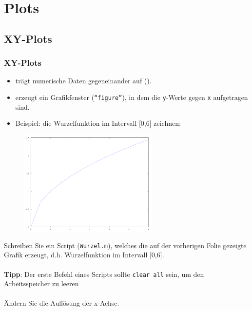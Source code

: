       \section{Plots}

      \subsection{XY-Plots}
      \begin{frame}
          \frametitle{XY-Plots}

          \vspace{-0.5cm}

          \begin{itemize}
              \item {} trägt numerische Daten gegeneinander auf ().
              \item {} erzeugt ein Grafikfenster (\texttt{``figure''}), in dem die \texttt{y}-Werte gegen \texttt{x} aufgetragen sind.
              \item Beispiel: die Wurzelfunktion im Intervall [0,6] zeichnen:
          \end{itemize}

          \vspace{-0.3cm}

          \begin{figure}
              \includegraphics[width=7.0cm]{example2_1.png}
          \end{figure}
      \end{frame}

      \secMexercise
      \begin{frame}
          \frameMexercise
          \begin{exercise}
              \sloppy
              Schreiben Sie ein Script (\texttt{Wurzel.m}), welches die auf der vorherigen Folie gezeigte Grafik erzeugt, d.h. Wurzelfunktion im Intervall [0,6].\\ \\

              \textbf{Tipp}: Der erste Befehl eines Scripts sollte \texttt{clear all} sein, um den Arbeitsspeicher zu leeren\\ \\

              Ändern Sie die Auflösung der x-Achse.
          \end{exercise}
      \end{frame}

